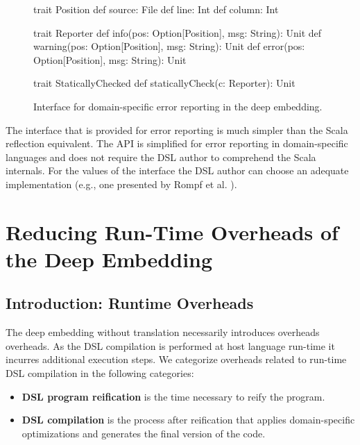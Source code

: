 \begin{figure}
\begin{listingtiny}
trait Position {
  def source: File
  def line: Int
  def column: Int
}

trait Reporter {
  def info(pos: Option[Position], msg: String): Unit
  def warning(pos: Option[Position], msg: String): Unit
  def error(pos: Option[Position], msg: String): Unit
}

trait StaticallyChecked {
  def staticallyCheck(c: Reporter): Unit
}
\end{listingtiny}
\caption{Interface for domain-specific error reporting in the deep embedding.}
\label{fig:statically-checked}
\end{figure}

The interface that is provided for error reporting is much simpler than the Scala reflection equivalent. The API
is simplified for error reporting in domain-specific languages and does not require the
DSL author to comprehend the Scala internals. For the values of the  interface
the DSL author can choose an adequate implementation (e.g., one presented by Rompf et al. \cite{rompf_scala-virtualized:_2009}).




\chapter{Reducing Run-Time Overheads of the Deep Embedding}
\label{sec:reducing-runtime-overheads}

\section{Introduction: Runtime Overheads}
\label{sec:runtime-overheads-deep}

The deep embedding without translation necessarily introduces overheads overheads. As the
DSL compilation is performed at host language run-time it incurres additional execution steps. We categorize overheads
related to run-time DSL compilation in the following categories:\begin{itemize}
 \item {\bf DSL program reification} is the time necessary to reify the program.
 \item {\bf DSL compilation} is the process after reification that applies domain-specific optimizations and
   generates the final version of the code.
\end{itemize}

